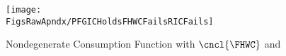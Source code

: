 \begin{figure}
\centerline{\texttt{[image: \\FigsRawApndx/PFGICHoldsFHWCFailsRICFails]}}
\caption{Nondegenerate Consumption Function with $\cncl{\FHWC}$ and \cncl{\RIC}}
\label{fig:PFGICHoldsFHWCFailsRICFails}
\end{figure}
